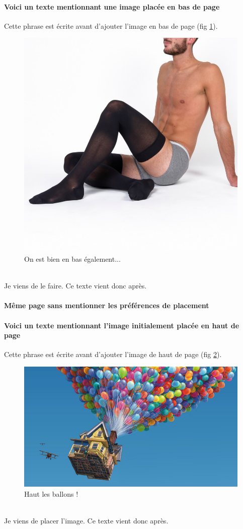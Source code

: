 \documentclass[a4paper, 13pt]{report} %
\begin{document}
		\paragraph{Voici un texte mentionnant une image placée en bas de page\\}
			Cette phrase est écrite avant d'ajouter l'image en bas de page (fig \ref{fig:bas1}).
			\begin{figure}[b]\centering
				\includegraphics[width=.35\textwidth]{positions/bas.jpg}
				\caption{\label{fig:bas1}On est bien en bas également...}
			\end{figure}
			\\Je viens de le faire. Ce texte vient donc après.
			
		\newpage
		\paragraph{Même page sans mentionner les préférences de placement}
		\paragraph{Voici un texte mentionnant l'image initialement placée en haut de page\\}
			Cette phrase est écrite avant d'ajouter l'image de haut de page (fig \ref{fig:haut2}).
			\begin{figure}\centering
				\includegraphics[width=.5\textwidth]{positions/haut.jpg}
				\caption{\label{fig:haut2}Haut les ballons !}
			\end{figure}
			\\Je viens de placer l'image. Ce texte vient donc après.
\end{document}

